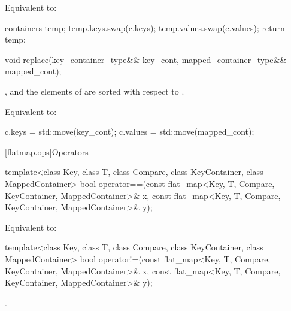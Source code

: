 \begin{codeblock}
\begin{codeblock}
\begin{codeblock}
\begin{addedblock}
\begin{itemdescr}
\effects Equivalent to:
\begin{codeblock}
containers temp;
temp.keys.swap(c.keys);
temp.values.swap(c.values);
return temp;
\end{codeblock}
\end{itemdescr}

%
\begin{itemdecl}
void replace(key_container_type&& key_cont, mapped_container_type&& mapped_cont);
\end{itemdecl}

\begin{itemdescr}
\pnum \expects
{}, and the elements of
 are sorted with respect to .

\pnum
\effects Equivalent to:
\begin{codeblock}
c.keys = std::move(key_cont);
c.values = std::move(mapped_cont);
\end{codeblock}
\end{itemdescr}

[flatmap.ops]{Operators}

%
\begin{itemdecl}
template<class Key, class T, class Compare, class KeyContainer, class MappedContainer>
  bool operator==(const flat_map<Key, T, Compare, KeyContainer, MappedContainer>& x,
                  const flat_map<Key, T, Compare, KeyContainer, MappedContainer>& y);
\end{itemdecl}

\begin{itemdescr}
\pnum
\effects Equivalent to:
\end{itemdescr}

%
\begin{itemdecl}
template<class Key, class T, class Compare, class KeyContainer, class MappedContainer>
  bool operator!=(const flat_map<Key, T, Compare, KeyContainer, MappedContainer>& x,
                  const flat_map<Key, T, Compare, KeyContainer, MappedContainer>& y);
\end{itemdecl}

\begin{itemdescr}
\pnum \returns {}.
\end{itemdescr}


\end{addedblock}
\end{codeblock}
\end{codeblock}
\end{codeblock}
